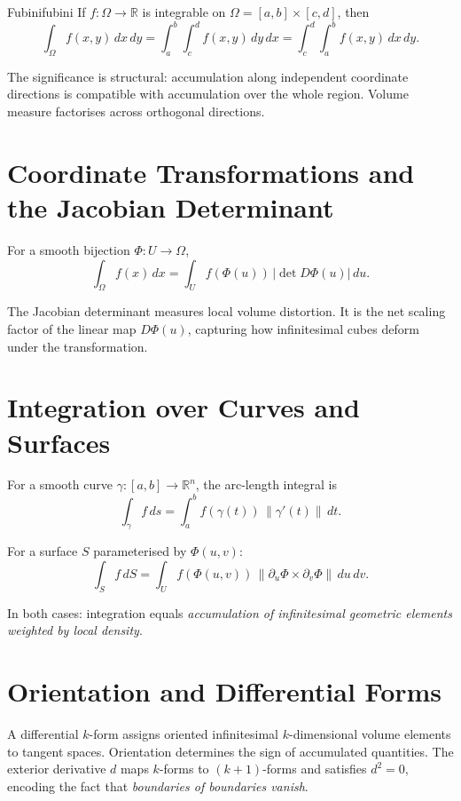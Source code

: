 \documentclass[12pt,openany]{book}
\newcommand{\R}{\mathbb{R}}
\begin{document}
\begin{theorem}{Fubini}{fubini}
  If $f:\Omega\to\R$ is integrable on $\Omega=[a,b]\times[c,d]$, then
  \[
    \int_\Omega f(x,y)\,dx\,dy
    = \int_a^b\!\!\int_c^d f(x,y)\,dy\,dx
    = \int_c^d\!\!\int_a^b f(x,y)\,dx\,dy.
  \]
\end{theorem}

The significance is structural: accumulation along independent coordinate
directions is compatible with accumulation over the whole region. Volume measure
factorises across orthogonal directions.

\section{Coordinate Transformations and the Jacobian Determinant}

For a smooth bijection $\Phi:U\to\Omega$,
\[
  \int_\Omega f(x)\,dx
  = \int_U f(\Phi(u))\,|\det D\Phi(u)|\,du.
\]

The Jacobian determinant measures local volume distortion. It is the net scaling
factor of the linear map $D\Phi(u)$, capturing how infinitesimal cubes deform
under the transformation.

\section{Integration over Curves and Surfaces}

For a smooth curve $\gamma:[a,b]\to\R^n$, the arc-length integral is
\[
  \int_\gamma f\,ds
  = \int_a^b f(\gamma(t))\,\|\gamma'(t)\|\,dt.
\]

For a surface $S$ parameterised by $\Phi(u,v)$:
\[
  \int_S f\,dS
  = \int_U f(\Phi(u,v))\,
    \|\partial_u\Phi\times\partial_v\Phi\|\,du\,dv.
\]

In both cases: integration equals \emph{accumulation of infinitesimal geometric
elements weighted by local density}.

\section{Orientation and Differential Forms}

A differential $k$-form assigns oriented infinitesimal $k$-dimensional volume
elements to tangent spaces. Orientation determines the sign of accumulated
quantities. The exterior derivative $d$ maps $k$-forms to $(k+1)$-forms and
satisfies $d^2=0$, encoding the fact that \emph{boundaries of boundaries
vanish}.
\end{document}

